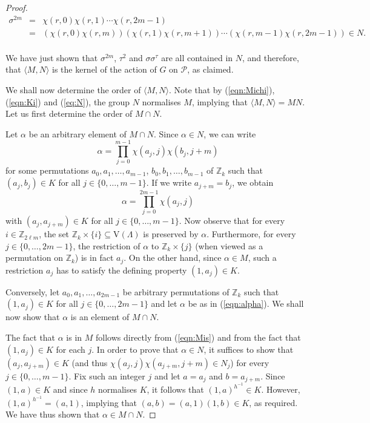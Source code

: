 \documentclass{amsart}
\theoremstyle{definition}
\begin{document}
\begin{proof}
\begin{eqnarray*}
\sigma^{2m}&=& \chi(r,0)\chi(r,1)\cdots \chi(r,2m-1)\\
&=&(\chi(r,0)\chi(r,m))(\chi(r,1)\chi(r,m+1))\cdots (\chi(r,m-1)\chi(r,2m-1))\in N.\\
\end{eqnarray*} 

We have just shown that $\sigma^{2m}$, $\tau^2$ and $\sigma\sigma^\tau$ are all contained in $N$, and therefore, that ${\langle} M, N{\rangle}$ is the kernel of the action of $G$ on ${\mathcal P}$, as claimed. 

We shall now determine the order of ${\langle} M, N{\rangle}$. Note that by (\ref{eqn:Michi}), (\ref{eqn:Ki}) and (\ref{eq:N}),  the group $N$ normalises $M$,
implying that  ${\langle} M, N{\rangle}=MN$. Let us first determine the order of $M\cap N$.

Let $\alpha$ be an arbitrary element of $M\cap N$. Since $\alpha \in N$, we can write
\begin{equation*}
 \alpha = \prod_{j=0}^{m-1}{\chi(a_j,j)}\chi(b_j,j+m)
\end{equation*}
for some permutations $a_0, a_1, \ldots, a_{m-1}$, $b_{0}, b_{1}, \ldots, b_{m-1}$ of ${\mathbb Z}_k$ such that $(a_{j},b_{j}) \in K$ for all $j\in\{0,\ldots, m-1\}$. If we write $a_{j+m} = b_{j}$, we obtain
\begin{equation}
\label{eqn:alpha}
 \alpha = \prod_{j=0}^{2m-1}\chi(a_j,j)
\end{equation}
with $(a_j,a_{j+m}) \in K$ for all $j\in\{0,\ldots, m-1\}$. Now observe that for every $i\in {\mathbb Z}_{2\ell m}$, the set ${\mathbb Z}_k\times \{i\}  \subseteq {\mathrm V}(\Lambda)$ is preserved by $\alpha$. Furthermore, for every $j\in \{0,\ldots,2m-1\}$, the restriction of $\alpha$ to ${\mathbb Z}_k \times \{j\} $ (when viewed as a permutation on ${\mathbb Z}_k$) is in fact $a_{j}$. On the other hand, since $\alpha \in M$, such a restriction $a_{j}$ has to satisfy the defining property $(1,a_{j}) \in K$.

Conversely, let $a_{0}, a_{1}, \ldots, a_{2m-1}$ be arbitrary permutations of ${\mathbb Z}_k$ such that $(1,a_{j}) \in K$ for all $j\in \{0,\ldots,2m-1\}$ and let $\alpha$ be as in (\ref{eqn:alpha}). We shall now show that $\alpha$  is an element of $M\cap N$. 

The fact that $\alpha$ is in $M$ follows directly from (\ref{eqn:Mis}) and from the fact that $(1,a_j) \in K$ for each $j$. In order to prove that $\alpha\in N$, it suffices to show that $(a_{j},a_{j+m}) \in K$ (and thus $\chi(a_j,j) \chi(a_{j+m},j+m) \in N_j$)  for every $j\in \{0,\ldots, m-1\}$. Fix such an integer $j$ and let $a=a_{j}$ and $b=a_{j+m}$. Since $(1,a)\in K$ and since $h$ normalises $K$, it follows that $(1,a)^{h^{-1}} \in K$. However, $(1,a)^{h^{-1}}=(a,1)$, implying that $(a,b) = (a,1)(1,b) \in K$, as required. We have thus shown that $\alpha \in M \cap N$.


\end{proof}
\end{document}
